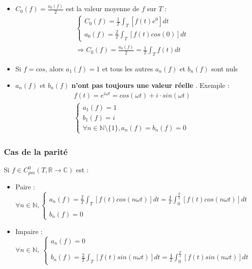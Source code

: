 \documentclass[12pt, a4paper]{article}
\begin{document}
\begin{itemize}
	\item $\displaystyle C_0(f) = \frac{a_0(f)}{2}$ est la valeur moyenne de $f$ sur $T$ :
		\begin{align*}
			\begin{cases}
				\displaystyle
				C_0(f) = \frac{1}{T} \int_T [f(t)e^{0}]dt \\
				\displaystyle
				a_0(f) = \frac{2}{T} \int_T [f(t) cos(0)]dt
			\end{cases} \\
			\Rightarrow C_0(f) = \frac{a_0(f)}{2} = \frac{1}{T} \int_T f(t)dt
		\end{align*}
	\item Si $f = cos$, alors $a_1(f) = 1$ et tous les autres $a_n(f)$ et $b_n(f)$ sont nuls
	\item $a_n(f)$ et $b_n(f)$ \textbf{ n'ont pas toujours une valeur réelle }. Exemple :
		\begin{align*}
			f(t) = e^{i\omega t} = cos(\omega t) + i \cdot sin(\omega t) \\
			\begin{cases}
				a_1(f) = 1 \\
				b_1(f) = i \\
				\forall n \in \mathbb{N}\setminus \{1\}, a_n(f) = b_n(f) = 0
			\end{cases}
		\end{align*}
\end{itemize}

\subsubsection{Cas de la parité}

\begin{tcolorbox}
	Si $f \in C_{pm}^0(T, \mathbb{R} \to \mathbb{C})$ est :
	\begin{itemize}
		\item Paire :
			\begin{equation*}
				\forall n \in \mathbb{N},
					\begin{cases}
						\displaystyle
						a_n(f) = \frac{2}{T} \int_T [f(t) cos(n\omega t)]dt = \frac{4}{T} \int_0^{\frac{T}{2}} [f(t) cos(n\omega t)]dt \\
						{} \\
						\displaystyle
						b_n(f) = 0
					\end{cases}
			\end{equation*}
		\item Impaire :
			\begin{equation*}
				\forall n \in \mathbb{N}, ~ 
				\begin{cases}
					\displaystyle
					a_n(f) = 0 \\
					{} \\
					\displaystyle
					b_n(f) = \frac{2}{T} \int_T [f(t) sin(n\omega t)]dt = \frac{4}{T} \int_0^{\frac{T}{2}} [f(t) sin(n\omega t)]dt
				\end{cases}
			\end{equation*}
	\end{itemize}
\end{tcolorbox}
\end{document}

